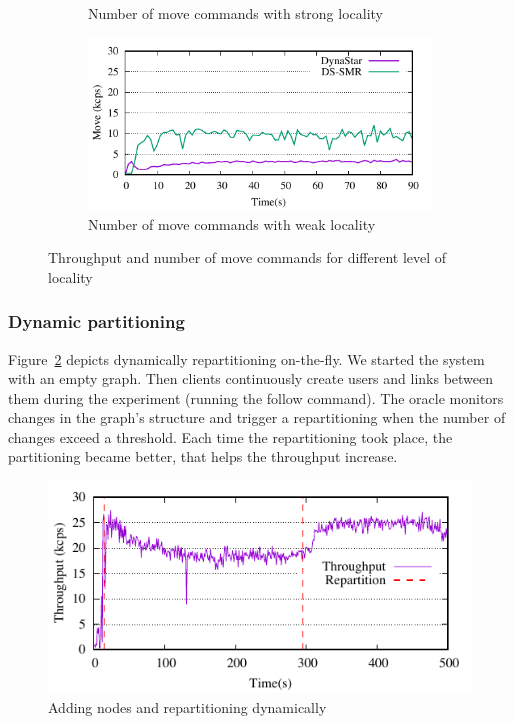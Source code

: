 \begin{figure}[ht!]
\begin{subfigure}[b]{0.45\textwidth}
    \caption{Number of move commands with strong locality }
  \end{subfigure}
  \begin{subfigure}[b]{0.45\textwidth}
    \centering
    \includegraphics[width=0.95\columnwidth]{figures/experiments/move-dynastar-vs-dssmr-4p}
    \caption{Number of move commands with weak locality}
  \end{subfigure}
  \caption{Throughput and number of move commands for different level of locality}
  \label{fig:motivation}
\end{figure}

\subsubsection{Dynamic partitioning}
Figure~\ref{fig:dynamic_load_tput} depicts dynamically repartitioning on-the-fly.
We started the system with an empty graph. Then clients continuously create users and links between them
during the experiment (running the follow command).  The oracle monitors changes in the graph's structure and 
trigger a repartitioning when the number of changes exceed a threshold.
Each time the repartitioning took place, the partitioning became better, that helps the throughput increase. 

\begin{figure}[ht]
	\includegraphics{figures/experiments/dynamicload-tp-move-4p}
	\caption{Adding nodes and repartitioning dynamically}
	\label{fig:dynamic_load_tput}
\end{figure}


